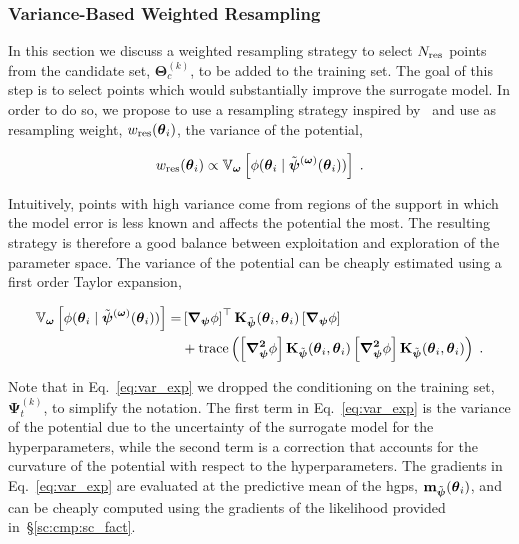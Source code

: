 \subsubsection{Variance-Based Weighted Resampling}
\label{sc:surr:select}

In this section we discuss a weighted resampling strategy to select ${N_{\mathrm{res}}}$ points from the candidate set, $\boldsymbol{\Theta}_c^{(k)}$, to be added to the training set. The goal of this step is to select points which would substantially improve the surrogate model. In order to do so, we propose to use a resampling strategy inspired by~\cite{gelman2014} and use as resampling weight, $w_{\mathrm{res}}(\boldsymbol{\theta}_i)$, the variance of the potential,

\begin{equation}
  w_{\mathrm{res}}(\boldsymbol{\theta}_i) \propto \mathbb{V}_{\boldsymbol{\omega}} \left[ \phi(\boldsymbol{\theta}_i \mid \tilde{\boldsymbol{\psi}}^{(\boldsymbol{\omega})}(\boldsymbol{\theta}_i))\right] \;.
  \label{eq:var}
\end{equation}

Intuitively, points with high variance come from regions of the support in which the model error is less known and affects the potential the most. The resulting strategy is therefore a good balance between exploitation and exploration of the parameter space.
The variance of the potential can be cheaply estimated using a first order Taylor expansion,

\begin{equation}
  \left. 
      \begin{aligned}
        \mathbb{V}_{\boldsymbol{\omega}} \left[ \phi(\boldsymbol{\theta}_i \mid \tilde{\boldsymbol{\psi}}^{(\boldsymbol{\omega})}(\boldsymbol{\theta}_i))\right] = &\left[\boldsymbol{\nabla_{\boldsymbol{\psi}}} \phi \right]^{\top} \mathbf{K}_{\tilde{\boldsymbol{\psi}}}(\boldsymbol{\theta}_i, \boldsymbol{\theta}_i) \left[\boldsymbol{\nabla_{\boldsymbol{\psi}}} \phi \right]\\
      &+ \text{trace}\left(\left[\boldsymbol{\nabla^2_{\boldsymbol{\psi}}} \phi \right] \mathbf{K}_{\tilde{\boldsymbol{\psi}}}(\boldsymbol{\theta}_i, \boldsymbol{\theta}_i) \left[\boldsymbol{\nabla^2_{\boldsymbol{\psi}}} \phi \right] \mathbf{K}_{\tilde{\boldsymbol{\psi}}}(\boldsymbol{\theta}_i, \boldsymbol{\theta}_i) \right)\;.
      \end{aligned}
  \right.
  \label{eq:var_exp}
\end{equation}

\smallskip
Note that in Eq.~\eqref{eq:var_exp} we dropped the conditioning on the training set, $\boldsymbol{\Psi}_t^{(k)}$, to simplify the notation. The first term in Eq.~\eqref{eq:var_exp} is the variance of the potential due to the uncertainty of the surrogate model for the hyperparameters, while the second term is a correction that accounts for the curvature of the potential with respect to the hyperparameters. 
The gradients in Eq.~\eqref{eq:var_exp} are evaluated at the predictive mean of the \glspl{hgp}, $\mathbf{m}_{\tilde{\boldsymbol{\psi}}}(\boldsymbol{\theta}_i)$, and can be cheaply computed using the gradients of the likelihood provided in~\S\ref{sc:cmp:sc_fact}.

